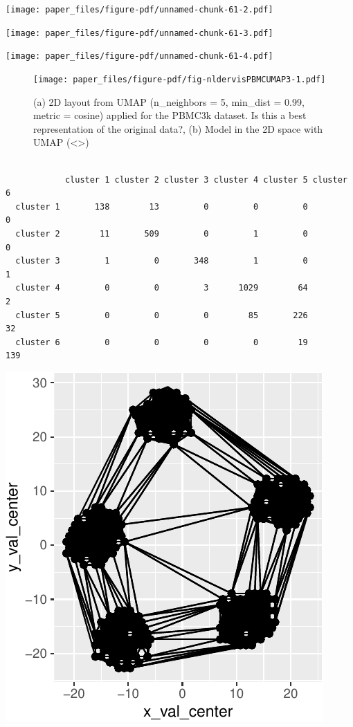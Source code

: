 \documentclass[
  12pt]{article}
\begin{document}
\texttt{[image: paper\_files/figure-pdf/unnamed-chunk-61-2.pdf]}

\texttt{[image: paper\_files/figure-pdf/unnamed-chunk-61-3.pdf]}

\texttt{[image: paper\_files/figure-pdf/unnamed-chunk-61-4.pdf]}

\begin{figure}[h]

{\centering \texttt{[image: paper\_files/figure-pdf/fig-nldervisPBMCUMAP3-1.pdf]}

}

\caption{\label{fig-nldervisPBMCUMAP3}(a) 2D layout from UMAP
(n\_neighbors = 5, min\_dist = 0.99, metric = cosine) applied for the
PBMC3k dataset. Is this a best representation of the original data?, (b)
Model in the 2D space with UMAP (\textless\textgreater)}

\end{figure}

\begin{verbatim}
           
            cluster 1 cluster 2 cluster 3 cluster 4 cluster 5 cluster 6
  cluster 1       138        13         0         0         0         0
  cluster 2        11       509         0         1         0         0
  cluster 3         1         0       348         1         0         1
  cluster 4         0         0         3      1029        64         2
  cluster 5         0         0         0        85       226        32
  cluster 6         0         0         0         0        19       139
\end{verbatim}

\includegraphics{paper_files/figure-pdf/unnamed-chunk-64-1.pdf}
\end{document}

